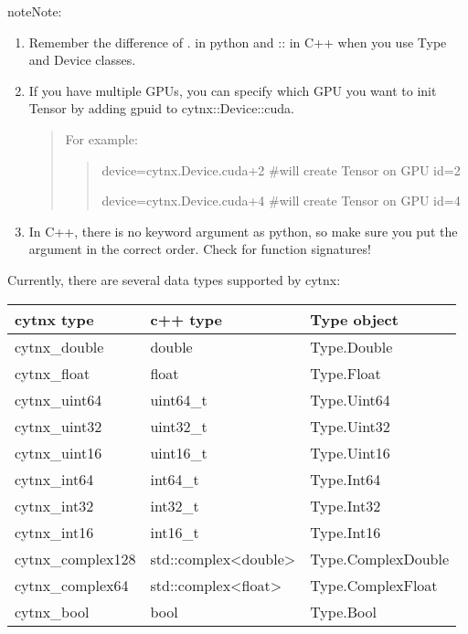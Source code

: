 \documentclass[letterpaper,10pt,english]{sphinxmanual}
\begin{document}
\begin{sphinxadmonition}{note}{Note:}\begin{enumerate}
%
\item {} 
Remember the difference of . in python and :: in C++ when you use Type and Device classes.

\item {} 
If you have multiple GPUs, you can specify which GPU you want to init Tensor by adding gpu\sphinxhyphen{}id to cytnx::Device::cuda.
\begin{quote}

For example:
\begin{quote}

device=cytnx.Device.cuda+2   \#will create Tensor on GPU id=2

device=cytnx.Device.cuda+4   \#will create Tensor on GPU id=4
\end{quote}
\end{quote}

\item {} 
In C++, there is no keyword argument as python, so make sure you put the argument in the correct order. Check  for function signatures!

\end{enumerate}
\end{sphinxadmonition}

Currently, there are several data types supported by cytnx:


\begin{savenotes}\sphinxattablestart
\centering
\begin{tabulary}{\linewidth}[t]{|l|l|l|}
\hline
\sphinxstyletheadfamily 
cytnx type
&\sphinxstyletheadfamily 
c++ type
&\sphinxstyletheadfamily 
Type object
\\
\hline
cytnx\_double
&
double
&
Type.Double
\\
\hline
cytnx\_float
&
float
&
Type.Float
\\
\hline
cytnx\_uint64
&
uint64\_t
&
Type.Uint64
\\
\hline
cytnx\_uint32
&
uint32\_t
&
Type.Uint32
\\
\hline
cytnx\_uint16
&
uint16\_t
&
Type.Uint16
\\
\hline
cytnx\_int64
&
int64\_t
&
Type.Int64
\\
\hline
cytnx\_int32
&
int32\_t
&
Type.Int32
\\
\hline
cytnx\_int16
&
int16\_t
&
Type.Int16
\\
\hline
cytnx\_complex128
&
std::complex\textless{}double\textgreater{}
&
Type.ComplexDouble
\\
\hline
cytnx\_complex64
&
std::complex\textless{}float\textgreater{}
&
Type.ComplexFloat
\\
\hline
cytnx\_bool
&
bool
&
Type.Bool
\\
\hline
\end{tabulary}
\par
\sphinxattableend\end{savenotes}
\end{document}
